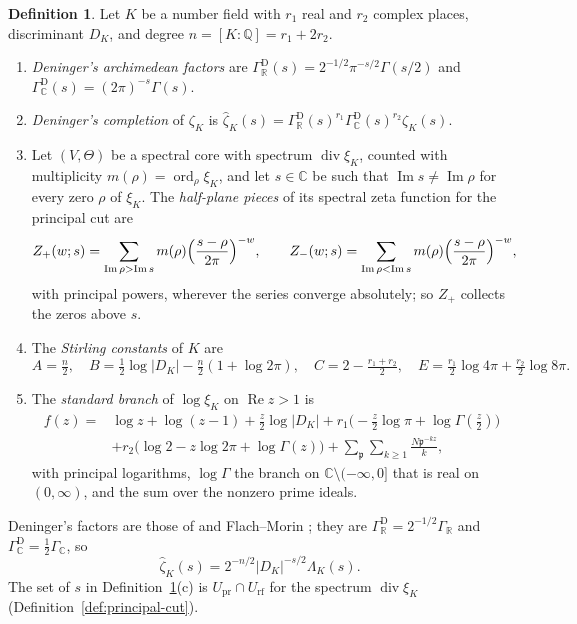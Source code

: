 \documentclass[11pt]{amsart}
\theoremstyle{plain}
\theoremstyle{definition}
\newtheorem{definition}[theorem]{Definition}
\theoremstyle{remark}
\numberwithin{equation}{section}
\newcommand{\C}{\mathbb{C}}
\newcommand{\R}{\mathbb{R}}
\newcommand{\Q}{\mathbb{Q}}
\newcommand{\GR}{\Gamma_{\mathbb{R}}}
\newcommand{\GC}{\Gamma_{\mathbb{C}}}
\DeclareMathOperator{\divisor}{div}
\DeclareMathOperator{\Ima}{Im}
\DeclareMathOperator{\Rea}{Re}
\DeclareMathOperator{\ord}{ord}
\renewcommand{\Re}{\Rea}
\renewcommand{\Im}{\Ima}
\begin{document}
\begin{definition}\label{def:deninger-gamma}
Let $K$ be a number field with $r_1$ real and $r_2$ complex places,
discriminant $D_K$, and degree $n=[K:\Q]=r_1+2r_2$.
\begin{enumerate}[label=(\alph*)]
\item \emph{Deninger's archimedean factors} are
  $\Gamma^{\mathrm D}_{\R}(s)=2^{-1/2}\pi^{-s/2}\Gamma(s/2)$ and
  $\Gamma^{\mathrm D}_{\C}(s)=(2\pi)^{-s}\Gamma(s)$.
\item \emph{Deninger's completion} of $\zeta_K$ is
  $\widehat\zeta_K(s)=\Gamma^{\mathrm D}_{\R}(s)^{r_1}
  \Gamma^{\mathrm D}_{\C}(s)^{r_2}\zeta_K(s)$.
\item Let $(V,\Theta)$ be a spectral core with spectrum
  $\divisor\xi_K$, counted with multiplicity $m(\rho)=\ord_\rho\xi_K$,
  and let $s\in\C$ be such that $\Im s\ne\Im\rho$ for every zero $\rho$
  of $\xi_K$. The \emph{half-plane pieces} of its spectral zeta function
  for the principal cut are
  \[
  Z_+(w;s)=\sum_{\Im\rho>\Im s}m(\rho)
    \Bigl(\frac{s-\rho}{2\pi}\Bigr)^{-w},\qquad
  Z_-(w;s)=\sum_{\Im\rho<\Im s}m(\rho)
    \Bigl(\frac{s-\rho}{2\pi}\Bigr)^{-w},
  \]
  with principal powers, wherever the series converge absolutely; so
  $Z_+$ collects the zeros above $s$.
\item The \emph{Stirling constants} of $K$ are
  \[
  A=\tfrac n2,\quad B=\tfrac12\log|D_K|-\tfrac n2(1+\log2\pi),\quad
  C=2-\tfrac{r_1+r_2}2,\quad
  E=\tfrac{r_1}2\log4\pi+\tfrac{r_2}2\log8\pi.
  \]
\item The \emph{standard branch} of $\log\xi_K$ on $\Re z>1$ is
  \[
  \begin{aligned}
  f(z)={}&\log z+\log(z-1)+\tfrac z2\log|D_K|
  +r_1\bigl(-\tfrac z2\log\pi+\log\Gamma(\tfrac z2)\bigr)\\
  &+r_2\bigl(\log2-z\log2\pi+\log\Gamma(z)\bigr)
  +\sum_{\mathfrak p}\sum_{k\ge1}\frac{N\mathfrak p^{-kz}}k,
  \end{aligned}
  \]
  with principal logarithms, $\log\Gamma$ the branch on
  $\C\setminus(-\infty,0]$ that is real on $(0,\infty)$, and the sum
  over the nonzero prime ideals.
\end{enumerate}
\end{definition}

Deninger's factors are those of \cite[p.~247]{Deninger1991Gamma} and
Flach--Morin \cite[(1), p.~521]{FlachMorin2020DeningerWeilArakelov};
they are $\Gamma^{\mathrm D}_{\R}=2^{-1/2}\GR$ and
$\Gamma^{\mathrm D}_{\C}=\tfrac12\GC$, so
\begin{equation}\label{eq:zeta-hat}
\widehat\zeta_K(s)=2^{-n/2}|D_K|^{-s/2}\Lambda_K(s).
\end{equation}
The set of $s$ in Definition~\ref{def:deninger-gamma}(c) is
$U_{\mathrm{pr}}\cap U_{\mathrm{rf}}$ for the spectrum $\divisor\xi_K$
(Definition~\ref{def:principal-cut}).
\end{document}
